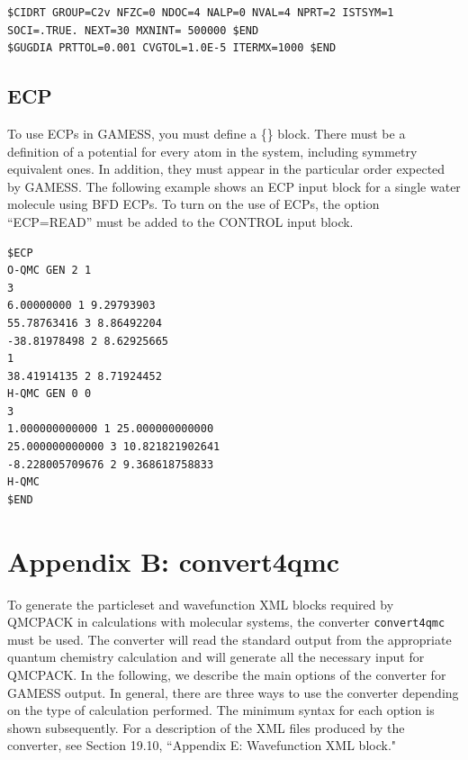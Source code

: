 \begin{lstlisting}[style=GAMESS]
$CIDRT GROUP=C2v NFZC=0 NDOC=4 NALP=0 NVAL=4 NPRT=2 ISTSYM=1 SOCI=.TRUE. NEXT=30 MXNINT= 500000 $END
$GUGDIA PRTTOL=0.001 CVGTOL=1.0E-5 ITERMX=1000 $END
\end{lstlisting}


\subsection{ECP}
To use ECPs in GAMESS, you must define a \{\} 
block. There must be a definition of a potential for every atom in the system, including
symmetry equivalent ones. In addition, they must appear in the particular order expected
by GAMESS. The following example shows an ECP input block for a single water molecule using
BFD ECPs. To turn on the use of ECPs, the option “ECP=READ” must be added to the
CONTROL input block.

\begin{lstlisting}[style=GAMESS]
$ECP
O-QMC GEN 2 1
3
6.00000000 1 9.29793903
55.78763416 3 8.86492204
-38.81978498 2 8.62925665
1
38.41914135 2 8.71924452
H-QMC GEN 0 0
3
1.000000000000 1 25.000000000000
25.000000000000 3 10.821821902641
-8.228005709676 2 9.368618758833
H-QMC
$END
\end{lstlisting}


\newpage
\section{Appendix B: convert4qmc}
To generate the particleset and wavefunction XML blocks required by QMCPACK in
calculations with molecular systems, the converter \texttt{convert4qmc} must be used. The converter
will read the standard output from the appropriate quantum chemistry calculation and will
generate all the necessary input for QMCPACK. In the following, we describe the main options of the
converter for GAMESS output. In general, there are three ways to use the converter depending
on the type of calculation performed. The minimum syntax for each option is shown subsequently.
For a description of the XML files produced by the converter, see Section 19.10, ``Appendix E: Wavefunction XML block."

